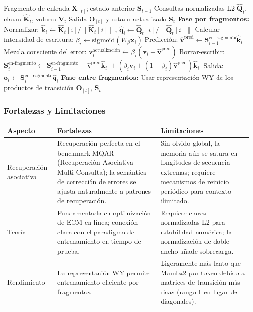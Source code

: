 \documentclass[11pt,a4paper]{article}
\begin{document}
\begin{algorithm}[H]
\caption{Actualización de Estado de DeltaNet con Representación WY}
\begin{algorithmic}[1]
\Require Fragmento de entrada $\mathbf{X}_{[t]}$; estado anterior $\mathbf{S}_{t-1}$
\Require Consultas normalizadas L2 $\hat{\mathbf{Q}}_t$, claves $\hat{\mathbf{K}}_t$, valores $\mathbf{V}_t$
\Ensure Salida $\mathbf{O}_{[t]}$ y estado actualizado $\mathbf{S}_t$
\State \textbf{Fase por fragmentos:}
    \State Normalizar: $\hat{\mathbf{k}}_i \gets \hat{\mathbf{K}}_t[i] / \|\hat{\mathbf{K}}_t[i]\|$, $\hat{\mathbf{q}}_i \gets \hat{\mathbf{Q}}_t[i] / \|\hat{\mathbf{Q}}_t[i]\|$
    \State Calcular intensidad de escritura: $\beta_i \gets \text{sigmoid}(W_\beta \mathbf{x}_i)$
    \State Predicción: $\hat{\mathbf{v}}^\text{pred} \gets \mathbf{S}_{i-1}^\text{en-fragmento} \hat{\mathbf{k}}_i$
    \State Mezcla consciente del error: $\mathbf{v}_i^\text{actualización} \gets \beta_i(\mathbf{v}_i - \hat{\mathbf{v}}^\text{pred})$
    \State Borrar-escribir: $\mathbf{S}_i^\text{en-fragmento} \gets \mathbf{S}_{i-1}^\text{en-fragmento} - \hat{\mathbf{v}}^\text{pred}\hat{\mathbf{k}}_i^\top + (\beta_i \mathbf{v}_i + (1-\beta_i)\hat{\mathbf{v}}^\text{pred})\hat{\mathbf{k}}_i^\top$
    \State Salida: $\mathbf{o}_i \gets \mathbf{S}_i^\text{en-fragmento} \hat{\mathbf{q}}_i$
\EndFor
\State \textbf{Fase entre fragmentos:} Usar representación WY de los productos de transición
\Return $\mathbf{O}_{[t]}$, $\mathbf{S}_{t}$
\end{algorithmic}
\end{algorithm}

\subsubsection{Fortalezas y Limitaciones}

\begin{table}[H]
\centering
\small
\begin{tabularx}{0.95\linewidth}{Xp{4cm}p{4cm}}
\toprule
\textbf{Aspecto} & \textbf{Fortalezas} & \textbf{Limitaciones} \\
\midrule
Recuperación asociativa & Recuperación perfecta en el benchmark MQAR (Recuperación Asociativa Multi-Consulta); la semántica de corrección de errores se ajusta naturalmente a patrones de recuperación. & Sin olvido global, la memoria aún se satura en longitudes de secuencia extremas; requiere mecanismos de reinicio periódico para contexto ilimitado. \\
Teoría & Fundamentada en optimización de ECM en línea; conexión clara con el paradigma de entrenamiento en tiempo de prueba. & Requiere claves normalizadas L2 para estabilidad numérica; la normalización de doble ancho añade sobrecarga. \\
Rendimiento & La representación WY permite entrenamiento eficiente por fragmentos. & Ligeramente más lento que Mamba2 por token debido a matrices de transición más ricas (rango 1 en lugar de diagonales). \\
\bottomrule
\end{tabularx}
\end{table}
\end{document}
